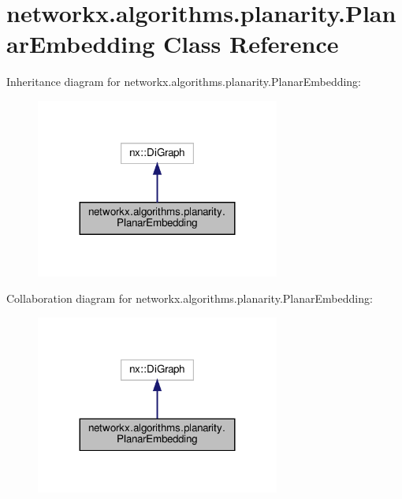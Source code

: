 \hypertarget{classnetworkx_1_1algorithms_1_1planarity_1_1PlanarEmbedding}{}\section{networkx.\+algorithms.\+planarity.\+Planar\+Embedding Class Reference}
\label{classnetworkx_1_1algorithms_1_1planarity_1_1PlanarEmbedding}


Inheritance diagram for networkx.\+algorithms.\+planarity.\+Planar\+Embedding\+:
\nopagebreak
\begin{figure}[H]
\begin{center}
\leavevmode
\includegraphics[width=227pt]{classnetworkx_1_1algorithms_1_1planarity_1_1PlanarEmbedding__inherit__graph}
\end{center}
\end{figure}


Collaboration diagram for networkx.\+algorithms.\+planarity.\+Planar\+Embedding\+:
\nopagebreak
\begin{figure}[H]
\begin{center}
\leavevmode
\includegraphics[width=227pt]{classnetworkx_1_1algorithms_1_1planarity_1_1PlanarEmbedding__coll__graph}
\end{center}
\end{figure}

